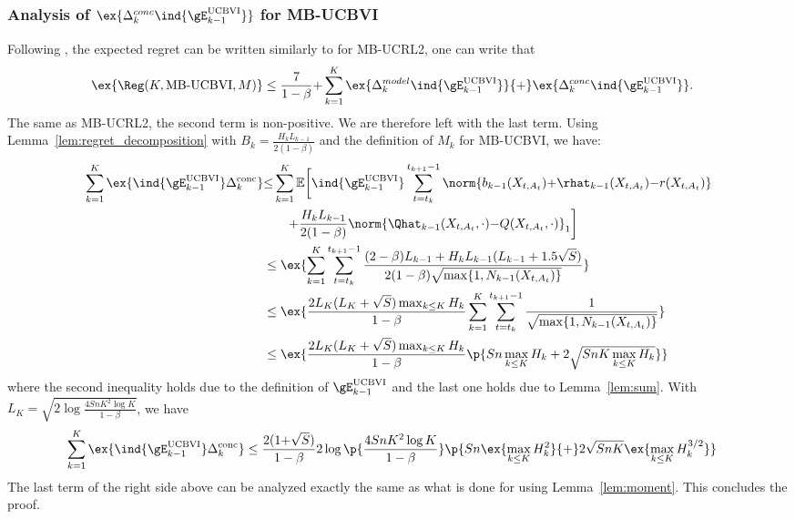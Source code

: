 \subsubsection{Analysis of $\ex{\Delta^{conc}_k\ind{\gE^\text{UCBVI}_{k-1}}}$ for MB-UCBVI}
Following , the expected regret can be written similarly to  for MB-UCRL2, one can write that
\begin{align*}
    \ex{\Reg(K,\text{MB-UCBVI},M)}
    &\le \frac{7}{1-\beta} {+} \sum_{k=1}^{K} \ex{\Delta^{model}_k\ind{\gE^\text{UCBVI}_{k-1}}} {+} \ex{\Delta^{conc}_k\ind{\gE^\text{UCBVI}_{k-1}}}.
\end{align*}
The same as MB-UCRL2, the second term is non-positive.
We are therefore left with the last term.
Using Lemma~\ref{lem:regret_decomposition} with $B_k=\frac{H_kL_{k-1}}{2(1-\beta)}$ and the definition of $M_k$ for MB-UCBVI, we have:
\begin{align*}
    \sum_{k=1}^K \ex{ \ind{\gE_{k{-}1}^\text{UCBVI}} \Delta_k^\text{conc}} &{\le} \sum_{k=1}^K \mathbb{E}\bigg[ \ind{\gE_{k{-}1}^\text{UCBVI}}\sum_{t=t_k}^{t_{k+1}-1} \norm{b_{k-1}(X_{t,A_t}) {+}\rhat_{k-1}(X_{t,A_t}){-}r(X_{t,A_t})} \\
    &\qquad {+}\frac{H_kL_{k-1}}{2(1-\beta)}\norm{\Qhat_{k-1}(X_{t,A_t},\cdot){-}Q(X_{t,A_t},\cdot)}_1 \bigg] \\
    &\le \ex{\sum_{k=1}^{K}\sum_{t=t_k}^{t_{k+1}-1} \frac{(2-\beta)L_{k-1}+H_kL_{k-1}(L_{k-1}+1.5\sqrt{S})}{2(1-\beta)\sqrt{\max\{1,N_{k-1}(X_{t,A_t})\} }}} \\
    &\le \ex{\frac{2L_K(L_K+\sqrt{S})\max_{k\le K}H_k}{1-\beta} \sum_{k=1}^{K} \sum_{t=t_k}^{t_{k+1}-1} \frac1{\sqrt{\max\{1,N_{k-1}(X_{t,A_t})\} }}} \\
    &\le \ex{\frac{2L_K(L_K+\sqrt{S})\max_{k\le K}H_k}{1-\beta} \p{Sn\max_{k\le K}H_k +2\sqrt{SnK\max_{k\le K}H_k} }} 
\end{align*}
where the second inequality holds due to the definition of $\gE_{k-1}^\text{UCBVI}$ and the last one holds due to Lemma~\ref{lem:sum}.
With $L_K{=}\sqrt{2\log\frac{4SnK^2\log K}{1-\beta}}$, we have
\begin{align*}
    \sum_{k=1}^K \ex{ \ind{\gE_{k{-}1}^\text{UCBVI}} \Delta_k^\text{conc}}
    &\le \frac{2(1{+}\sqrt{S})}{1-\beta} 2\log\p{\frac{4SnK^2\log K}{1-\beta}} \p{Sn\ex{\max_{k\le K}H_k^2} {+}2\sqrt{SnK} \ex{\max_{k\le K}H_k^{3/2}}}
\end{align*}
The last term of the right side above can be analyzed exactly the same as what is done for  using Lemma~\ref{lem:moment}.
This concludes the proof.

